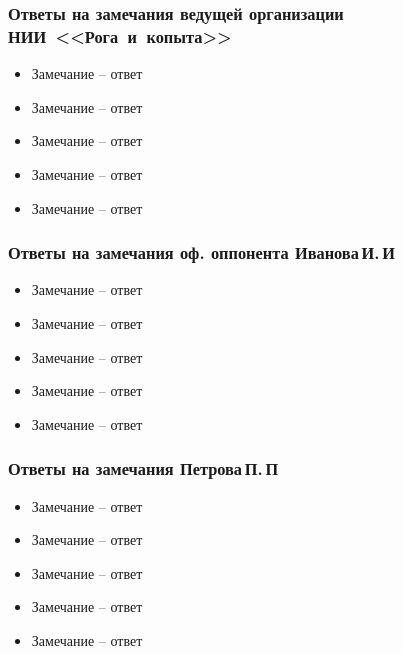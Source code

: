\begin{frame}
    \frametitle{Ответы на замечания ведущей организации НИИ~<<Рога~и~копыта>>}
    \begin{itemize}
        \item Замечание -- ответ
        \item Замечание -- ответ
        \item Замечание -- ответ
        \item Замечание -- ответ
        \item Замечание -- ответ
    \end{itemize}
\end{frame}

\begin{frame}
    \frametitle{Ответы на замечания оф. оппонента Иванова\,И.\,И}
    \begin{itemize}
        \item Замечание -- ответ
        \item Замечание -- ответ
        \item Замечание -- ответ
        \item Замечание -- ответ
        \item Замечание -- ответ
    \end{itemize}
\end{frame}

\begin{frame}
    \frametitle{Ответы на замечания Петрова\,П.\,П}
    \begin{itemize}
        \item Замечание -- ответ
        \item Замечание -- ответ
        \item Замечание -- ответ
        \item Замечание -- ответ
        \item Замечание -- ответ
    \end{itemize}
\end{frame}
